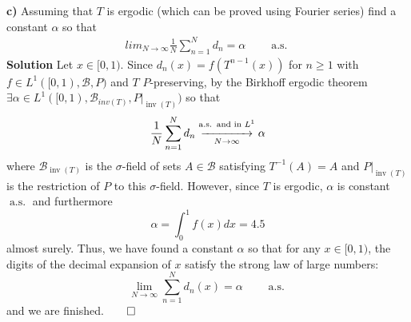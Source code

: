 \documentclass[10pt]{article}
\newcommand{\1}[1]{\mathbbm{1}_{#1}}
\newcommand{\mc}[1]{\mathcal{#1}}
\DeclareMathOperator{\as}{a.s.}
\DeclareMathOperator{\inv}{inv}
\begin{document}
    {\bf c)}\hspace{5pt} Assuming that $T$ is ergodic (which can be proved using Fourier series) find a constant $\alpha$ so that 
    \begin{align*}
        lim_{N\rightarrow\infty}\frac{1}{N}\sum_{n=1}^Nd_n=\alpha\qquad\as
    \end{align*}
    {\bf Solution}\hspace{5pt} Let $x\in[0,1)$. Since $d_n(x)=f(T^{n-1}(x))$ for $n\geq 1$ with $f\in L^1([0,1),\mc{B},P)$ and $T$ $P$-preserving, by the Birkhoff ergodic theorem $\exists \alpha\in L^1([0,1),\mc{B}_{inv(T)},P|_{\inv(T)})$ so that
    \[\frac{1}{N}\sum_{n=1}^Nd_n\overunderset{\as\text{ and in $L^1$}}{N\rightarrow\infty}{\xrightarrow{\hspace*{40pt}}}\alpha\]
    where $\mc{B}_{\inv(T)}$ is the $\sigma$-field of sets $A\in\mc{B}$ satisfying $T^{-1}(A)=A$ and $P|_{\inv(T)}$ is the restriction of $P$ to this $\sigma$-field. However, since $T$ is ergodic, $\alpha$ is constant $\as$ and furthermore
    \[\alpha=\int_0^1f(x)dx=4.5\]
    almost surely. Thus, we have found a constant $\alpha$ so that for any $x\in[0,1)$, the digits of the decimal expansion of $x$ satisfy the strong law of large numbers:
    \[\lim_{N\rightarrow\infty}\sum_{n=1}^Nd_n(x)=\alpha\qquad\as\]
    and we are finished.\hfill{$\qed$}\\[5pt]
\end{document}
